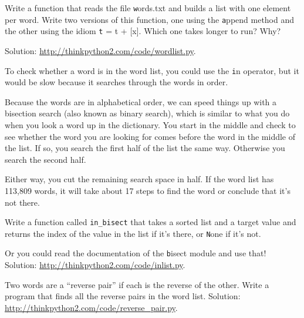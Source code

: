 \documentclass[
DIV=11,
fontsize=12,
twoside,
headinclude=false,
titlepage=firstiscover,
abstract=true,
headsepline=true,
footsepline=true,
chapterprefix=true, %
headings=big,
bibliography=totoc,%
captions=tableheading
]{scrbook}
\theoremstyle{definition}
\begin{document}
\begin{exercise}
\normalfont
{}

Write a function that reads the file {\texttt words.txt} and builds
a list with one element per word.  Write two versions of
this function, one using the {\texttt append} method and the
other using the idiom {\texttt t = t + [x]}.  Which one takes
longer to run?  Why?

Solution: \url{http://thinkpython2.com/code/wordlist.py}.

\end{exercise}


\begin{exercise}
\normalfont
\label{wordlist1}
\label{bisection}

To check whether a word is in the word list, you could use
the {\texttt in} operator, but it would be slow because it searches
through the words in order.

Because the words are in alphabetical order, we can speed things up
with a bisection search (also known as binary search), which is
similar to what you do when you look a word up in the dictionary.  You
start in the middle and check to see whether the word you are looking
for comes before the word in the middle of the list.  If so, you
search the first half of the list the same way.  Otherwise you search
the second half.

Either way, you cut the remaining search space in half.  If the
word list has 113,809 words, it will take about 17 steps to
find the word or conclude that it's not there.

Write a function called \verb"in_bisect" that takes a sorted list
and a target value and returns the index of the value
in the list if it's there, or {\texttt None} if it's not.

Or you could read the documentation of the {\texttt bisect} module
and use that!  Solution: \url{http://thinkpython2.com/code/inlist.py}.

\end{exercise}

\begin{exercise}
\normalfont
{}

Two words are a ``reverse pair'' if each is the reverse of the
other.  Write a program that finds all the reverse pairs in the
word list.  Solution: \url{http://thinkpython2.com/code/reverse_pair.py}.

\end{exercise}
\end{document}
